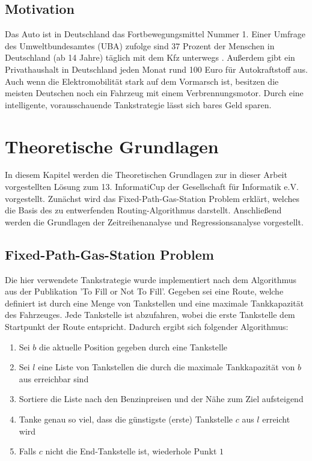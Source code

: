 \documentclass[
ngerman          %
,a4paper          %
,11pt
,pdftex
]{report}
\begin{document}
\section{Motivation}
Das Auto ist in Deutschland das Fortbewegungsmittel Nummer 1. Einer Umfrage des Umweltbundesamtes (UBA) zufolge sind 37 Prozent der Menschen in Deutschland (ab 14 Jahre) täglich mit dem Kfz unterwegs \cite{fortbewegung}. Außerdem gibt ein Privathaushalt in Deutschland jeden Monat rund 100 Euro für Autokraftstoff aus. Auch wenn die Elektromobilität stark auf dem Vormarsch ist, besitzen die meisten Deutschen noch ein Fahrzeug mit einem Verbrennungsmotor. Durch eine intelligente, vorausschauende Tankstrategie lässt sich bares Geld sparen. 


\chapter{Theoretische Grundlagen}

In diesem Kapitel werden die Theoretischen Grundlagen zur in dieser Arbeit vorgestellten Lösung zum 13. InformatiCup der Gesellschaft für Informatik e.V. vorgestellt. Zunächst wird das Fixed-Path-Gas-Station Problem erklärt, welches die Basis des zu entwerfenden Routing-Algorithmus darstellt. Anschließend werden die Grundlagen der Zeitreihenanalyse und Regressionsanalyse vorgestellt.

\section{Fixed-Path-Gas-Station Problem}

Die hier verwendete Tankstrategie wurde implementiert nach dem Algorithmus aus der Publikation 'To Fill or Not To Fill'\cite{fixedgas}.
Gegeben sei eine Route, welche definiert ist durch eine Menge von Tankstellen und eine maximale Tankkapazität des Fahrzeuges.
Jede Tankstelle ist abzufahren, wobei die erste Tankstelle dem Startpunkt der Route entspricht.
Dadurch ergibt sich folgender Algorithmus:
\begin{enumerate}
\item Sei $b$ die aktuelle Position gegeben durch eine Tankstelle
\item Sei $l$ eine Liste von Tankstellen die durch die maximale Tankkapazität von $b$ aus erreichbar sind
\item Sortiere die Liste nach den Benzinpreisen und der Nähe zum Ziel aufsteigend
\item Tanke genau so viel, dass die günstigste (erste) Tankstelle $c$ aus $l$ erreicht wird
\item Falls $c$ nicht die End-Tankstelle ist, wiederhole Punkt $1$
\end{enumerate}
\end{document}
